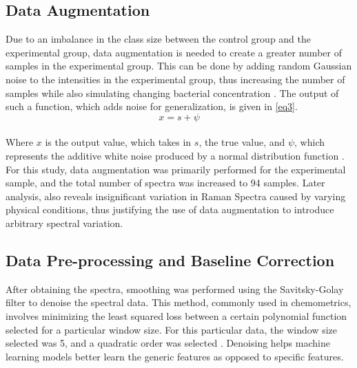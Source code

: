\subsection{Data Augmentation}

Due to an imbalance in the class size between the control group and the experimental group, data augmentation is needed to create a greater number of samples in the experimental group. This can be done by adding random Gaussian noise to the intensities in the experimental group, thus increasing the number of samples while also simulating changing bacterial concentration \cite{CEA_HAL_01839859}. The output of such a function, which adds noise for generalization, is given in \autoref{eq3}. \\
\begin{equation}
\label{eq3}
x = s + \psi
\end{equation} \\
\noindent Where $x$ is the output value, which takes in $s$, the true value, and $\psi$, which represents the additive white noise produced by a normal distribution function \cite{SciDirect_WhiteNoise}. For this study, data augmentation was primarily performed for the experimental sample, and the total number of spectra was increased to 94 samples. Later analysis, also reveals insignificant variation in Raman Spectra caused by varying physical conditions, thus justifying the use of data augmentation to introduce arbitrary spectral variation. 

\subsection{Data Pre-processing and Baseline Correction}

After obtaining the spectra, smoothing was performed using the Savitsky-Golay filter to denoise the spectral data. This method, commonly used in chemometrics, involves minimizing the least squared loss between a certain polynomial function selected for a particular window size.  For this particular data, the window size selected was 5, and a quadratic order was selected \cite{SciHub_AC60214a047}. Denoising helps machine learning models better learn the generic features as opposed to specific features. \\

